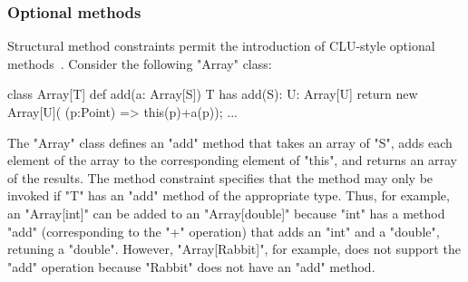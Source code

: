 \subsubsection{Optional methods}

Structural method constraints permit the introduction of
CLU-style optional methods~\cite{clu}.  Consider the following
\xcd"Array" class:
{
\begin{xten}
class Array[T] {
  def add(a: Array[S])
    {T has add(S): U}: Array[U] {
    return new Array[U](
      (p:Point) => this(p)+a(p));
  }
  ... }
\end{xten}}

\noindent
The \xcd"Array" class defines an \xcd"add" method that takes 
an array of \xcd"S", adds each element of the array to the
corresponding element of \xcd"this", and returns an array of the
results.  The method constraint specifies that the method may
only be invoked if \xcd"T" has an \xcd"add" method of the
appropriate type.  Thus, for example, an \xcd"Array[int]"
can be added to an \xcd"Array[double]" because \xcd"int"
has a method \xcd"add" (corresponding to the \xcd"+" operation)
that adds an \xcd"int" and a \xcd"double", retuning a
\xcd"double".  However, \xcd"Array[Rabbit]", for example, does not support
the \xcd"add" operation because \xcd"Rabbit" does not have an
\xcd"add" method.




